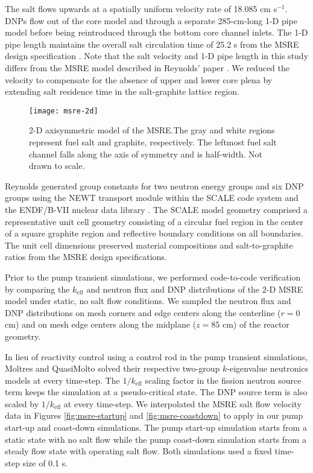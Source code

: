 The salt flows
upwards at a spatially uniform velocity rate of 18.085 cm s$^{-1}$. \glspl{DNP} flow out of the
core model and through a separate 285-cm-long 1-D pipe model before being reintroduced through the
bottom core channel inlets. The 1-D pipe length maintains the overall salt circulation time of
25.2 s from the \gls{MSRE} design specification \cite{robertson_msre_1965}. Note that the salt
velocity and 1-D pipe length in this study differs from the \gls{MSRE} model described in Reynolds'
paper \cite{reynolds_analysis_2023}. We reduced the velocity to compensate for the absence of upper
and lower core plena by extending salt residence time in the salt-graphite lattice region.

\begin{figure}[htb]
  \centering
  \texttt{[image: msre-2d]}
  \caption{2-D axisymmetric model of the \gls{MSRE}.The gray and white regions represent fuel salt
  and graphite, respectively. The leftmost fuel salt channel falls along the axis of symmetry and
  is half-width. Not drawn to scale.}
  \label{fig:pump-geom}
\end{figure}

Reynolds generated group constants for two neutron energy groups and six \gls{DNP} groups using the
NEWT transport module within the SCALE code system \cite{rearden_scale_2018} and the ENDF/B-VII
nuclear data library \cite{chadwick_endf/b-vii.1_2011}. The SCALE model geometry comprised a
representative unit cell geometry
consisting of a circular fuel region in the center of a square graphite region and reflective
boundary conditions on all boundaries. The unit cell dimensions preserved material compositions
and salt-to-graphite ratios from the \gls{MSRE} design specifications.

Prior to the pump transient simulations, we performed code-to-code verification by comparing the
$k_\text{eff}$ and neutron flux and \gls{DNP} distributions of the 2-D \gls{MSRE} model under
static, no salt flow conditions. We sampled the neutron flux and \gls{DNP} distributions on
mesh corners and edge centers along the centerline ($r=0$ cm) and on mesh edge centers along
the midplane ($z=85$ cm) of the reactor geometry.

In lieu of reactivity control using a control rod in the pump
transient simulations, Moltres and QuasiMolto solved their respective
two-group $k$-eigenvalue neutronics models at every time-step. The $1/k_\text{eff}$ scaling factor
in the fission neutron source term keeps the simulation at a pseudo-critical state. The \gls{DNP}
source term is also scaled by $1/k_\text{eff}$ at every time-step. We interpolated the \gls{MSRE}
salt flow velocity data in Figures \ref{fig:msre-startup} and \ref{fig:msre-coastdown} to apply in
our pump start-up and coast-down simulations. The pump start-up simulation starts from a static
state with no salt flow while the pump coast-down simulation starts from a steady flow state with
operating salt flow. Both simulations used a fixed time-step size of 0.1 s.

